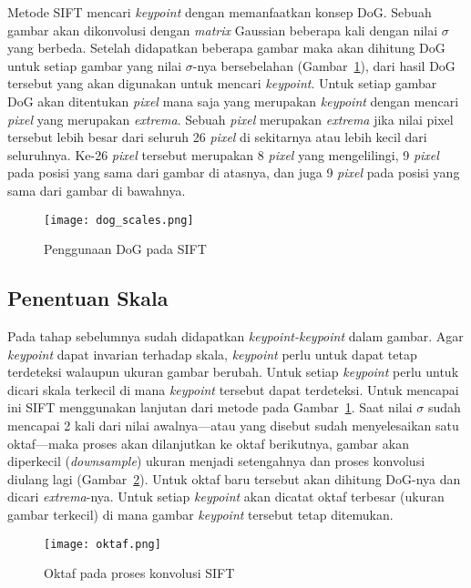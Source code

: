 Metode SIFT mencari \textit{keypoint} dengan memanfaatkan konsep DoG. Sebuah gambar akan dikonvolusi dengan \textit{matrix} Gaussian beberapa kali dengan nilai $\sigma$ yang berbeda. Setelah didapatkan beberapa gambar maka akan dihitung DoG untuk setiap gambar yang nilai $\sigma$-nya bersebelahan (Gambar~\ref{fig:dog_scales}), dari hasil DoG tersebut yang akan digunakan untuk mencari \textit{keypoint}. Untuk setiap gambar DoG akan ditentukan \textit{pixel} mana saja yang merupakan \textit{keypoint} dengan mencari \textit{pixel} yang merupakan \textit{extrema}. Sebuah \textit{pixel} merupakan \textit{extrema} jika nilai pixel tersebut lebih besar dari seluruh 26 \textit{pixel} di sekitarnya atau lebih kecil dari seluruhnya. Ke-26 \textit{pixel} tersebut merupakan 8 \textit{pixel} yang mengelilingi, 9 \textit{pixel} pada posisi yang sama dari gambar di atasnya, dan juga 9 \textit{pixel} pada posisi yang sama dari gambar di bawahnya.
\begin{figure}[H]
	\centering
	\texttt{[image: dog\_scales.png]}
	\caption{Penggunaan DoG pada SIFT}
	\label{fig:dog_scales}
\end{figure} 

\subsection{Penentuan Skala}
Pada tahap sebelumnya sudah didapatkan \textit{keypoint-keypoint} dalam gambar. Agar \textit{keypoint} dapat invarian terhadap skala, \textit{keypoint} perlu untuk dapat tetap terdeteksi walaupun ukuran gambar berubah. Untuk setiap \textit{keypoint} perlu untuk dicari skala terkecil di mana \textit{keypoint} tersebut dapat terdeteksi. Untuk mencapai ini SIFT menggunakan lanjutan dari metode pada Gambar~\ref{fig:dog_scales}. Saat nilai $\sigma$ sudah mencapai 2 kali dari nilai awalnya---atau yang disebut sudah menyelesaikan satu oktaf---maka proses akan dilanjutkan ke oktaf berikutnya, gambar akan diperkecil (\textit{downsample}) ukuran menjadi setengahnya dan proses konvolusi diulang lagi (Gambar~\ref{fig:oktaf}). Untuk oktaf baru tersebut akan dihitung DoG-nya dan dicari \textit{extrema}-nya. Untuk setiap \textit{keypoint} akan dicatat oktaf terbesar (ukuran gambar terkecil) di mana gambar \textit{keypoint} tersebut tetap ditemukan. 
\begin{figure}
	\centering
	\texttt{[image: oktaf.png]}
	\caption{Oktaf pada proses konvolusi SIFT}
	\label{fig:oktaf}
\end{figure}

